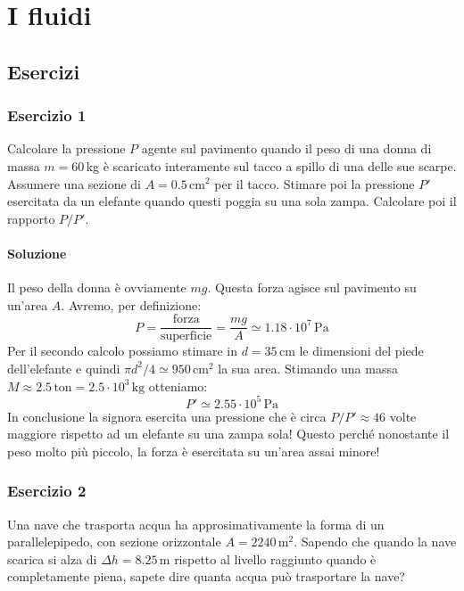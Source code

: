 \documentclass[12pt,a4paper]{book}
\begin{document}
\graphicspath{{./figure/6/}}

\newpage
\chapter{I fluidi}
\section{Esercizi}
\subsection*{Esercizio 1}
Calcolare la pressione $P$ agente sul pavimento quando il peso di una donna di massa $m=60 \,$kg è scaricato interamente sul tacco a spillo 
di una delle sue scarpe. Assumere una sezione di $A=0.5 \,$cm$^2$ per il tacco. Stimare poi la pressione $P'$ esercitata da un elefante quando questi poggia su una sola zampa. Calcolare poi il rapporto $P/P'$. 

\subsubsection*{Soluzione}
Il peso della donna è ovviamente $mg$. Questa forza agisce sul pavimento su un'area $A$. Avremo, per definizione:
\begin{equation*}
P=\frac{\text{forza}}{\text{superficie}}=\frac{mg}{A}\simeq 1.18 \cdot 10^{7} \, \text{Pa}
\end{equation*}
Per il secondo calcolo possiamo stimare in $d=35 \,$cm le dimensioni del piede dell'elefante e quindi $\pi d^2/4 \simeq 950\,$cm$^2$ la sua area. Stimando
una massa $M\approx 2.5 \, \text{ton} = 2.5 \cdot 10^3 \, \text{kg}$ otteniamo:
\begin{equation*}
P'\simeq 2.55 \cdot 10^{5} \, \text{Pa}
\end{equation*}
In conclusione la signora esercita una pressione che è circa $P/P' \approx 46$ volte maggiore rispetto ad un elefante su una zampa sola! Questo perché 
nonostante il peso molto più piccolo, la forza è esercitata su un'area assai minore!

\subsection*{Esercizio 2}
Una nave che trasporta acqua ha approsimativamente la forma di un parallelepipedo, con sezione orizzontale $A=2240 \,$m$^2$. Sapendo che quando la nave scarica si alza di $\Delta h=8.25 \,$m rispetto al livello raggiunto quando è completamente piena, sapete dire quanta acqua può trasportare la nave?
\end{document}
